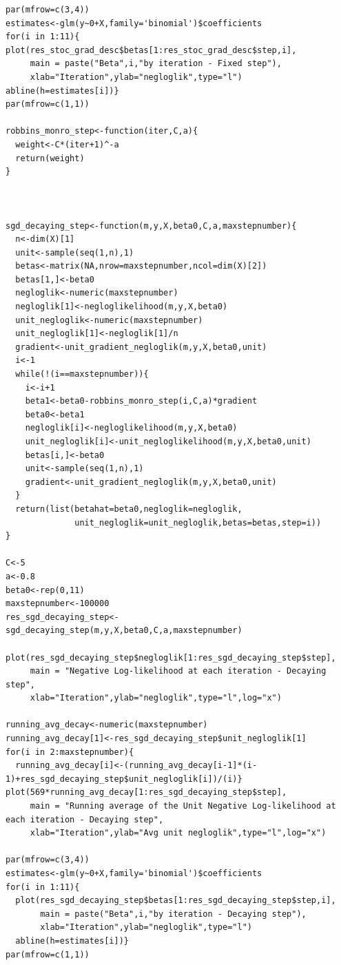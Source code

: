 \documentclass{article}
\begin{document}
\begin{lstlisting}[basicstyle=\tiny]
par(mfrow=c(3,4))
estimates<-glm(y~0+X,family='binomial')$coefficients
for(i in 1:11){
plot(res_stoc_grad_desc$betas[1:res_stoc_grad_desc$step,i],
     main = paste("Beta",i,"by iteration - Fixed step"),
     xlab="Iteration",ylab="negloglik",type="l")
abline(h=estimates[i])}
par(mfrow=c(1,1))

robbins_monro_step<-function(iter,C,a){
  weight<-C*(iter+1)^-a
  return(weight)
}



sgd_decaying_step<-function(m,y,X,beta0,C,a,maxstepnumber){
  n<-dim(X)[1]
  unit<-sample(seq(1,n),1)
  betas<-matrix(NA,nrow=maxstepnumber,ncol=dim(X)[2])
  betas[1,]<-beta0
  negloglik<-numeric(maxstepnumber)
  negloglik[1]<-negloglikelihood(m,y,X,beta0)
  unit_negloglik<-numeric(maxstepnumber)
  unit_negloglik[1]<-negloglik[1]/n
  gradient<-unit_gradient_negloglik(m,y,X,beta0,unit)
  i<-1
  while(!(i==maxstepnumber)){
    i<-i+1
    beta1<-beta0-robbins_monro_step(i,C,a)*gradient
    beta0<-beta1
    negloglik[i]<-negloglikelihood(m,y,X,beta0)
    unit_negloglik[i]<-unit_negloglikelihood(m,y,X,beta0,unit)
    betas[i,]<-beta0
    unit<-sample(seq(1,n),1)
    gradient<-unit_gradient_negloglik(m,y,X,beta0,unit)
  }
  return(list(betahat=beta0,negloglik=negloglik,
              unit_negloglik=unit_negloglik,betas=betas,step=i))
}

C<-5
a<-0.8
beta0<-rep(0,11)
maxstepnumber<-100000
res_sgd_decaying_step<-sgd_decaying_step(m,y,X,beta0,C,a,maxstepnumber)

plot(res_sgd_decaying_step$negloglik[1:res_sgd_decaying_step$step],
     main = "Negative Log-likelihood at each iteration - Decaying step",
     xlab="Iteration",ylab="negloglik",type="l",log="x")

running_avg_decay<-numeric(maxstepnumber)
running_avg_decay[1]<-res_sgd_decaying_step$unit_negloglik[1]
for(i in 2:maxstepnumber){
  running_avg_decay[i]<-(running_avg_decay[i-1]*(i-1)+res_sgd_decaying_step$unit_negloglik[i])/(i)}
plot(569*running_avg_decay[1:res_sgd_decaying_step$step],
     main = "Running average of the Unit Negative Log-likelihood at each iteration - Decaying step",
     xlab="Iteration",ylab="Avg unit negloglik",type="l",log="x")

par(mfrow=c(3,4))
estimates<-glm(y~0+X,family='binomial')$coefficients
for(i in 1:11){
  plot(res_sgd_decaying_step$betas[1:res_sgd_decaying_step$step,i],
       main = paste("Beta",i,"by iteration - Decaying step"),
       xlab="Iteration",ylab="negloglik",type="l")
  abline(h=estimates[i])}
par(mfrow=c(1,1))


\end{lstlisting}
\end{document}
